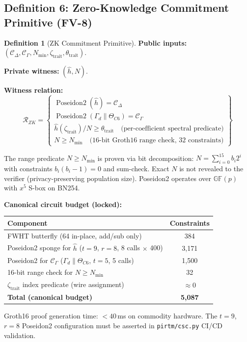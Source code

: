 \documentclass[12pt,letterpaper]{article}
\theoremstyle{definition}
\newtheorem{definition}{Definition}[section]
\theoremstyle{plain}
\theoremstyle{remark}
\newcommand{\Poseidon}{\operatorname{Poseidon2}}
\newcommand{\TC}{\Theta_{C6}}
\newcommand{\hhat}{\hat{h}}
\newcommand{\RZK}{\mathcal{R}_{ZK}}
\newcommand{\CGamma}{\mathcal{C}_{\Gamma}}
\newcommand{\CDelta}{\mathcal{C}_{\Delta}}
\newcommand{\GFp}{\mathbb{GF}(p)}
\begin{document}
\subsection{Definition 6: Zero-Knowledge Commitment Primitive (FV-8)}

\begin{definition}[ZK Commitment Primitive]
\textbf{Public inputs:} $(\CDelta, \CGamma, N_{\min}, \zeta_{\mathrm{trait}}, \theta_{\mathrm{trait}})$.

\textbf{Private witness:} $(\hhat, N)$.

\textbf{Witness relation:}
\[
  \RZK = \left\{
  \begin{array}{l}
    \Poseidon(\hhat) = \CDelta \\
    \Poseidon(\Gamma_d \| \TC) = \CGamma \\
    \hhat(\zeta_{\mathrm{trait}}) / N \ge \theta_{\mathrm{trait}}
      \quad\text{(per-coefficient spectral predicate)} \\
    N \ge N_{\min}
      \quad\text{(16-bit Groth16 range check, 32 constraints)}
  \end{array}
  \right\}
\]

The range predicate $N \ge N_{\min}$ is proven via bit decomposition: $N = \sum_{i=0}^{15} b_i 2^i$ with constraints $b_i(b_i - 1) = 0$ and sum-check. Exact $N$ is not revealed to the verifier (privacy-preserving population size). Poseidon2 operates over $\GFp$ with $x^5$ S-box on BN254.

\medskip
\noindent\textbf{Canonical circuit budget (locked):}
\begin{center}
\begin{tabular}{lc}
\toprule
Component & Constraints \\
\midrule
FWHT butterfly (64 in-place, add/sub only) & 384 \\
Poseidon2 sponge for $\hhat$ ($t=9$, $r=8$, 8 calls $\times$ 400) & 3,171 \\
Poseidon2 for $\CGamma$ ($\Gamma_d \| \TC$, $t=5$, 5 calls) & 1,500 \\
16-bit range check for $N \ge N_{\min}$ & 32 \\
$\zeta_{\mathrm{trait}}$ index predicate (wire assignment) & $\approx 0$ \\
\midrule
\textbf{Total (canonical budget)} & \textbf{5,087} \\
\bottomrule
\end{tabular}
\end{center}
Groth16 proof generation time: $<40$\,ms on commodity hardware. The $t=9$, $r=8$ Poseidon2 configuration must be asserted in \texttt{pirtm/csc.py} CI/CD validation.
\end{definition}
\end{document}
